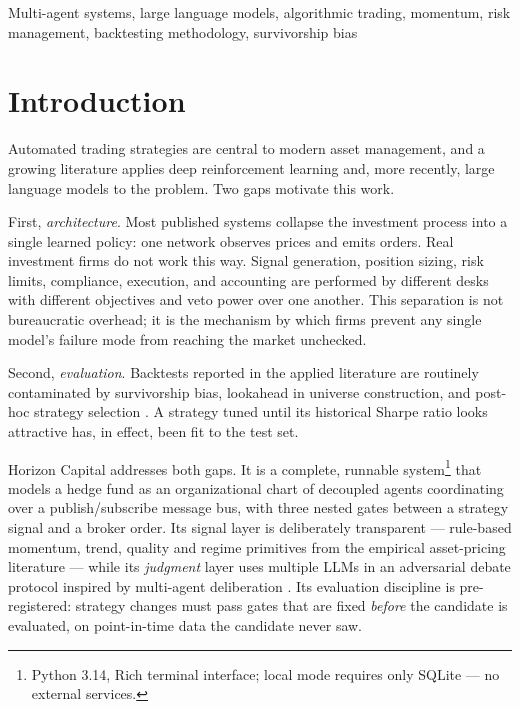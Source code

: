 \documentclass[10pt,twocolumn]{IEEEtran}
\begin{document}
\begin{IEEEkeywords}
Multi-agent systems, large language models, algorithmic trading, momentum,
risk management, backtesting methodology, survivorship bias
\end{IEEEkeywords}

\section{Introduction}

Automated trading strategies are central to modern asset management, and a
growing literature applies deep reinforcement learning
\cite{yang2020ensemble,xiong2018practical} and, more recently, large language
models \cite{yang2023fingpt,wu2023bloomberggpt} to the problem. Two gaps
motivate this work.

First, \emph{architecture}. Most published systems collapse the investment
process into a single learned policy: one network observes prices and emits
orders. Real investment firms do not work this way. Signal generation,
position sizing, risk limits, compliance, execution, and accounting are
performed by different desks with different objectives and veto power over
one another. This separation is not bureaucratic overhead; it is the
mechanism by which firms prevent any single model's failure mode from
reaching the market unchecked.

Second, \emph{evaluation}. Backtests reported in the applied literature are
routinely contaminated by survivorship bias, lookahead in universe
construction, and post-hoc strategy selection \cite{bailey2014deflated,
lopezdeprado2018advances}. A strategy tuned until its historical Sharpe ratio
looks attractive has, in effect, been fit to the test set.

Horizon Capital addresses both gaps. It is a complete, runnable
system\footnote{Python 3.14, Rich terminal interface; local mode requires
only SQLite --- no external services.} that models a hedge fund as an
organizational chart of decoupled agents coordinating over a
publish/subscribe message bus, with three nested gates between a strategy
signal and a broker order. Its signal layer is deliberately transparent ---
rule-based momentum, trend, quality and regime primitives from the empirical
asset-pricing literature \cite{jegadeesh1993returns,faber2007tactical,
asness2019qmj} --- while its \emph{judgment} layer uses multiple LLMs in an
adversarial debate protocol inspired by multi-agent deliberation
\cite{du2023improving,park2023generative}. Its evaluation discipline is
pre-registered: strategy changes must pass gates that are fixed \emph{before}
the candidate is evaluated, on point-in-time data the candidate never saw.
\end{document}
